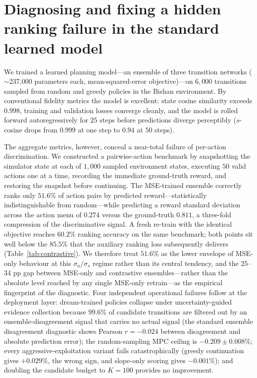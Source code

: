 \documentclass[11pt]{article}
\begin{document}
\section{Diagnosing and fixing a hidden ranking failure in the standard learned model}\label{sec:rank}

We trained a learned planning model---an ensemble of three transition networks ($\sim$237{,}000 parameters each, mean-squared-error objective)---on $6{,}000$ transitions sampled from random and greedy policies in the Bishan environment. By conventional fidelity metrics the model is excellent: state cosine similarity exceeds $0.998$, training and validation losses converge cleanly, and the model is rolled forward autoregressively for $25$ steps before predictions diverge perceptibly ($s$-cosine drops from $0.999$ at one step to $0.94$ at $50$ steps).

The aggregate metrics, however, conceal a near-total failure of per-action discrimination. We constructed a pairwise-action benchmark by snapshotting the simulator state at each of $1{,}000$ sampled environment states, executing $50$ valid actions one at a time, recording the immediate ground-truth reward, and restoring the snapshot before continuing. The MSE-trained ensemble correctly ranks only $51.6\%$ of action pairs by predicted reward---statistically indistinguishable from random---while predicting a reward standard deviation across the action menu of $0.274$ versus the ground-truth $0.811$, a three-fold compression of the discriminative signal. A fresh re-train with the identical objective reaches $60.2\%$ ranking accuracy on the same benchmark; both points sit well below the $85.5\%$ that the auxiliary ranking loss subsequently delivers (Table~\ref{tab:contrastive}). We therefore treat $51.6\%$ as the lower envelope of MSE-only behaviour at this $\sigma_a/\sigma_s$ regime rather than its central tendency, and the $25$--$34$ pp gap between MSE-only and contrastive ensembles---rather than the absolute level reached by any single MSE-only retrain---as the empirical fingerprint of the diagnostic. Four independent operational failures follow at the deployment layer: dream-trained policies collapse under uncertainty-guided evidence collection because $99.6\%$ of candidate transitions are filtered out by an ensemble-disagreement signal that carries no actual signal (the standard ensemble disagreement diagnostic shows Pearson $r = -0.024$ between disagreement and absolute prediction error); the random-sampling MPC ceiling is $-0.209 \pm 0.008\%$; every aggressive-exploitation variant fails catastrophically (greedy continuation gives $+0.029\%$, the wrong sign, and slope-only scoring gives $-0.001\%$); and doubling the candidate budget to $K{=}100$ provides no improvement.
\end{document}
